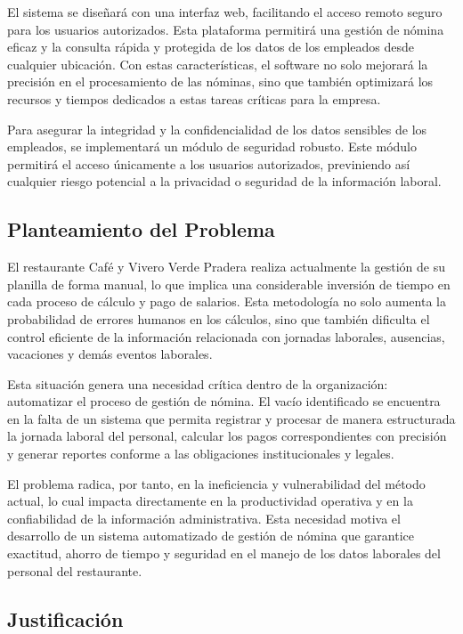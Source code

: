 El sistema se diseñará con una interfaz web, facilitando el acceso remoto seguro para
los usuarios autorizados. Esta plataforma permitirá una gestión de nómina eficaz y la
consulta rápida y protegida de los datos de los empleados desde cualquier ubicación.
Con estas características, el software no solo mejorará la precisión en el procesamiento
de las nóminas, sino que también optimizará los recursos y tiempos dedicados a estas tareas
críticas para la empresa.

Para asegurar la integridad y la confidencialidad de los datos sensibles de los empleados,
se implementará un módulo de seguridad robusto. Este módulo permitirá el acceso únicamente
a los usuarios autorizados, previniendo así cualquier riesgo potencial a la privacidad o
seguridad de la información laboral.

\subsection*{Planteamiento del Problema}
El restaurante Café y Vivero Verde Pradera realiza actualmente la gestión de su planilla de forma manual, lo que implica una considerable inversión de tiempo en cada proceso de cálculo y pago de salarios. Esta metodología no solo aumenta la probabilidad de errores humanos en los cálculos, sino que también dificulta el control eficiente de la información relacionada con jornadas laborales, ausencias, vacaciones y demás eventos laborales.

Esta situación genera una necesidad crítica dentro de la organización: automatizar el proceso de gestión de nómina. El vacío identificado se encuentra en la falta de un sistema que permita registrar y procesar de manera estructurada la jornada laboral del personal, calcular los pagos correspondientes con precisión y generar reportes conforme a las obligaciones institucionales y legales.

El problema radica, por tanto, en la ineficiencia y vulnerabilidad del método actual, lo cual impacta directamente en la productividad operativa y en la confiabilidad de la información administrativa. Esta necesidad motiva el desarrollo de un sistema automatizado de gestión de nómina que garantice exactitud, ahorro de tiempo y seguridad en el manejo de los datos laborales del personal del restaurante.



\subsection{Justificación}

